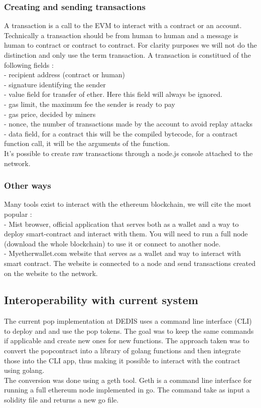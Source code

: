 \documentclass[11pt, a4paper, twoside, openright]{book} %
\begin{document}
\subsubsection{Creating and sending transactions}
A transaction is a call to the EVM to interact with a contract or an account. Technically a transaction should be from human to human and a message is human to contract or contract to contract. For clarity purposes we will not do the distinction and only use the term transaction. A transaction is constitued of the following fields : \\
- recipient address (contract or human) \\
- signature identifying the sender \\
- value field for transfer of ether. Here this field will always be ignored.\\
- gas limit, the maximum fee the sender is ready to pay \\
- gas price, decided by miners \\
- nonce, the number of transactions made by the account to avoid replay attacks\\
- data field, for a contract this will be the compiled bytecode, for a contract function call, it will be the arguments of the function. \\

It's possible to create raw transactions through a node.js console attached to the network.


\subsubsection{Other ways}
Many tools exist to interact with the ethereum blockchain, we will cite the most popular : \\
- Mist browser, official application that serves both as a wallet and a way to deploy smart-contract and interact with them. You will need to run a full node (download the whole blockchain) to use it or connect to another node.\\
- Myetherwallet.com website that serves as a wallet and way to interact with smart contract. The website is connected to a node and send transactions created on the website to the network.



\subsection{Interoperability with current system}
The current pop implementation at DEDIS uses a command line interface (CLI) to deploy and and use the pop tokens. The goal was to keep the same commands if applicable and create new ones for new functions. The approach taken was to convert the popcontract into a library of golang functions and then integrate those into the CLI app, thus making it possible to interact with the contract using golang.\\
The conversion was done using a geth tool. Geth is a command line interface for running a full ethereum node implemented in go. The command take as input a solidity file and returns a new go file.
\end{document}
